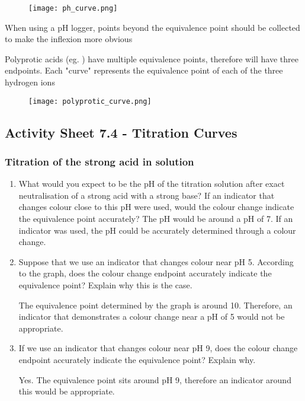		\begin{figure}[H]
			\centering
			\texttt{[image: ph\_curve.png]}
		\end{figure}

		When using a pH logger, points beyond the equivalence point should be collected to make the inflexion more obvious

		Polyprotic acids (eg. ) have multiple equivalence points, therefore will have three endpoints. Each "curve" represents the equivalence point of each of the three hydrogen ions

		\begin{figure}[H]
			\centering
			\texttt{[image: polyprotic\_curve.png]}
		\end{figure}

	\subsection{Activity Sheet 7.4 - Titration Curves}
	
		\subsubsection{Titration of the strong acid in solution}
		
			\begin{enumerate}
				\item What would you expect to be the pH of the titration solution after exact neutralisation of a strong acid with a strong base? If an indicator that changes colour close to this pH were used, would the colour change indicate the equivalence point accurately?
					The pH would be around a pH of 7. If an indicator was used, the pH could be accurately determined through a colour change.

				\item Suppose that we use an indicator that changes colour near pH 5. According to the graph, does the colour change endpoint accurately indicate the equivalence point? Explain why this is the case.

					The equivalence point determined by the graph is around 10. Therefore, an indicator that demonstrates a colour change near a pH of 5 would not be appropriate.

				\item If we use an indicator that changes colour near pH 9, does the colour change endpoint accurately indicate the equivalence point? Explain why.

					Yes. The equivalence point sits around pH 9, therefore an indicator around this would be appropriate.

			\end{enumerate}
		
